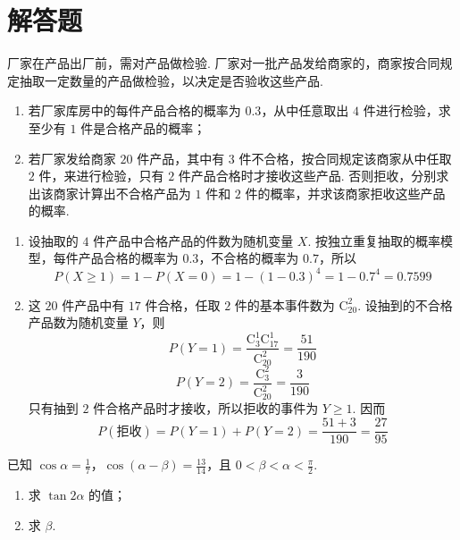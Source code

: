 \section{解答题}
\begin{problem}
厂家在产品出厂前，需对产品做检验. 厂家对一批产品发给商家的，商家按合同规定抽取一定数量的产品做检验，以决定是否验收这些产品.
\begin{enumerate}
\item 若厂家库房中的每件产品合格的概率为 \(0.3\)，从中任意取出 \(4\) 件进行检验，求至少有 \(1\) 件是合格产品的概率；
\item 若厂家发给商家 \(20\) 件产品，其中有 \(3\) 件不合格，按合同规定该商家从中任取 \(2\) 件，来进行检验，只有 \(2\) 件产品合格时才接收这些产品. 否则拒收，分别求出该商家计算出不合格产品为 \(1\) 件和 \(2\) 件的概率，并求该商家拒收这些产品的概率.
\end{enumerate}

\end{problem}

\begin{solution}
\begin{enumerate}
\item 设抽取的 \(4\) 件产品中合格产品的件数为随机变量 \(X\). 按独立重复抽取的概率模型，每件产品合格的概率为 \(0.3\)，不合格的概率为 \(0.7\)，所以
\[
P(X\geqslant1)=1-P(X=0)=1-(1-0.3)^4=1-0.7^4=0.7599
\]
\item 这 \(20\) 件产品中有 \(17\) 件合格，任取 \(2\) 件的基本事件数为 \(\mathrm C_{20}^{2}\). 设抽到的不合格产品数为随机变量 \(Y\)，则
\[
P(Y=1)=\frac{\mathrm C_{3}^{1}\mathrm C_{17}^{1}}{\mathrm C_{20}^{2}}=\frac{51}{190}
\]
\[
P(Y=2)=\frac{\mathrm C_{3}^{2}}{\mathrm C_{20}^{2}}=\frac{3}{190}
\]
只有抽到 \(2\) 件合格产品时才接收，所以拒收的事件为 \(Y\geqslant1\). 因而
\[
P(\text{拒收})=P(Y=1)+P(Y=2)=\frac{51+3}{190}=\frac{27}{95}
\]
\end{enumerate}
\end{solution}

\begin{problem}
已知 \(\cos \alpha = \frac{1}{7}\)，\(\cos (\alpha - \beta) = \frac{13}{14}\)，且 \(0 < \beta < \alpha < \frac{\pi}{2}\).
\begin{enumerate}
\item 求 \( \tan 2\alpha \) 的值；
\item 求 \( \beta \).
\end{enumerate}

\end{problem}

